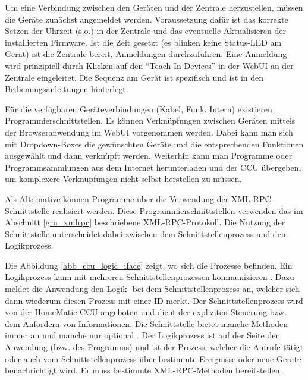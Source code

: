 Um eine Verbindung zwischen den Geräten und der Zentrale herzustellen, müssen die Geräte zunächst
angemeldet werden.
Voraussetzung dafür ist das korrekte Setzen der Uhrzeit (s.o.) in der Zentrale und das eventuelle
Aktualisieren der installierten Firmware.
Ist die Zeit gesetzt (es blinken keine Status-LED am Gerät) ist die Zentrale bereit, Anmeldungen
durchzuführen.
Eine Anmeldung wird prinzipiell durch Klicken auf den ``Teach-In Devices''
in der WebUI an der Zentrale eingeleitet.
Die Sequenz am Gerät ist spezifisch und ist in den Bedienungsanleitungen hinterlegt.

Für die verfügbaren Geräteverbindungen (Kabel, Funk, Intern) existieren Programmierschnittstellen.
Es können Verknüpfungen zwischen Geräten mittels der Browseranwendung im WebUI vorgenommen werden.
Dabei kann man sich mit Dropdown-Boxes die gewünschten Geräte und die entsprechenden Funktionen
ausgewählt und dann verknüpft werden.
Weiterhin kann man Programme oder Programmsammlungen aus dem Internet herunterladen und der CCU
übergeben, um komplexere Verknüpfungen nicht selbst herstellen zu müssen.

Als Alternative können Programme über die Verwendung der XML-RPC-Schnittstelle \cite[Seite 4]{homematic_xmlrpc}
realisiert werden.
Diese Programmierschnittstellen verwenden das im Abschnitt \ref{gru_xmlrpc} beschriebene XML-RPC-Protokoll.
Die Nutzung der Schnittstelle unterscheidet dabei zwischen dem Schnittstellenprozess und dem Logikprozess.

Die Abbildung \ref{abb_ccu_logic_iface} zeigt, wo sich die Prozesse befinden.
Ein Logikprozess kann mit mehreren Schnittstellenprozessen kommunizieren \cite[Seite 3]{homematic_xmlrpc}.
Dazu meldet die Anwendung den Logik- bei dem Schnittstellenprozess an, welcher sich dann wiederum diesen
Prozess mit einer ID merkt.
Der Schnittstellenprozess wird von der HomeMatic-CCU angeboten und dient der expliziten Steuerung
bzw. dem Anfordern von Informationen.
Die Schnittstelle bietet manche Methoden immer an und manche nur optional \cite[Seite 14]{homematic_xmlrpc}.
Der Logikprozess ist auf der Seite der Anwendung (bzw. des Programms) und ist der Prozess, welcher die
Aufrufe tätigt oder auch vom Schnittstellenprozess über bestimmte Ereignisse oder neue Geräte
benachrichtigt wird.
Er muss bestimmte XML-RPC-Methoden \cite[Seite 22]{homematic_xmlrpc} bereitstellen.

